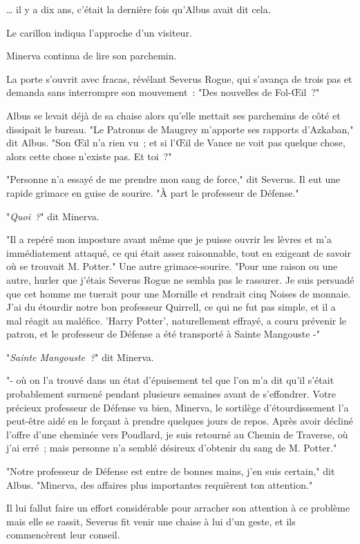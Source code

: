 … il y a dix ans, c'était la dernière fois qu'Albus avait dit cela.

Le carillon indiqua l'approche d'un visiteur.

Minerva continua de lire son parchemin.

La porte s'ouvrit avec fracas, révélant Severus Rogue, qui s'avança de trois pas et demanda sans interrompre son mouvement~: "Des nouvelles de Fol-Œil~?"

Albus se levait déjà de sa chaise alors qu'elle mettait ses parchemins de côté et dissipait le bureau. "Le Patronus de Maugrey m'apporte ses rapports d'Azkaban," dit Albus. "Son Œil n'a rien vu~; et si l'Œil de Vance ne voit pas quelque chose, alors cette chose n'existe pas. Et toi~?"

"Personne n'a essayé de me prendre mon sang de force," dit Severus. Il eut une rapide grimace en guise de sourire. "À part le professeur de Défense."

"\emph{Quoi~?}" dit Minerva.

"Il a repéré mon imposture avant même que je puisse ouvrir les lèvres et m'a immédiatement attaqué, ce qui était assez raisonnable, tout en exigeant de savoir où se trouvait M. Potter." Une autre grimace-sourire. "Pour une raison ou une autre, hurler que j'étais Severus Rogue ne sembla pas le rassurer. Je suis persuadé que cet homme me tuerait pour une Mornille et rendrait cinq Noises de monnaie. J'ai du étourdir notre bon professeur Quirrell, ce qui ne fut pas simple, et il a mal réagit au maléfice. 'Harry Potter', naturellement effrayé, a couru prévenir le patron, et le professeur de Défense a été transporté à Sainte Mangouste -"

"\emph{Sainte Mangouste~?}" dit Minerva.

"- où on l'a trouvé dans un état d'épuisement tel que l'on m'a dit qu'il s'était probablement surmené pendant plusieurs semaines avant de s'effondrer. Votre précieux professeur de Défense va bien, Minerva, le sortilège d'étourdissement l'a peut-être aidé en le forçant à prendre quelques jours de repos. Après avoir décliné l'offre d'une cheminée vers Poudlard, je suis retourné au Chemin de Traverse, où j'ai erré~; mais personne n'a semblé désireux d'obtenir du sang de M. Potter."

"Notre professeur de Défense est entre de bonnes mains, j'en suis certain," dit Albus. "Minerva, des affaires plus importantes requièrent ton attention."

Il lui fallut faire un effort considérable pour arracher son attention à ce problème mais elle se rassit, Severus fit venir une chaise à lui d'un geste, et ils commencèrent leur conseil.

